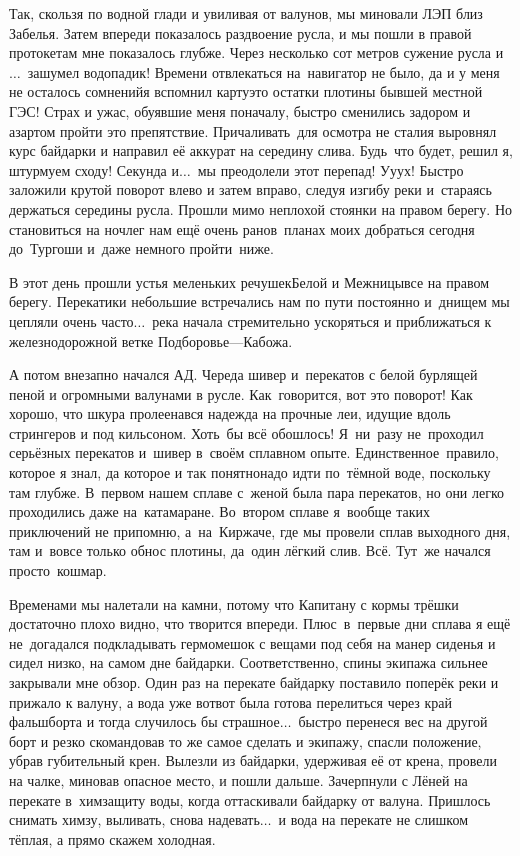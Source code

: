 Так, скользя по водной глади и увиливая от валунов, мы миновали ЛЭП близ Забелья. Затем впереди показалось раздвоение русла, и мы пошли в правой протоке\mdash там мне показалось глубже. Через несколько сот метров сужение русла и$\ldots$~зашумел водопадик! Времени отвлекаться на~навигатор не было, да и у меня не осталось сомнений\mdash я вспомнил карту\mdash это остатки плотины бывшей местной ГЭС! Страх и ужас, обуявшие меня поначалу, быстро сменились задором и азартом пройти это препятствие. Причаливать~для осмотра не стали\mdash я выровнял курс байдарки и направил её аккурат на середину слива. Будь~что будет, решил я, штурмуем сходу! Секунда и$\ldots$~мы преодолели этот перепад! У\sdash у\sdash ух! Быстро заложили крутой поворот влево и затем вправо, следуя изгибу реки и~стараясь держаться середины русла. Прошли мимо неплохой стоянки на правом берегу. Но становиться на ночлег нам ещё очень рано\mdash в~планах моих добраться сегодня до~Тургоши и~даже немного пройти~ниже. 

В этот день прошли устья меленьких речушек\mdash Белой и Межницы\mdash все на правом берегу. Перекатики небольшие встречались нам по пути постоянно и~днищем мы цепляли очень часто$\ldots$~река начала стремительно ускоряться и приближаться к железнодорожной ветке Подборовье\thinspace\nobreakdash---\thinspace Кабожа.

А потом внезапно начался АД. Череда шивер и~перекатов с белой бурлящей пеной и огромными валунами в русле. Как~говорится, вот это поворот! Как хорошо, что шкура пролеена\mdash вся надежда на прочные леи, идущие вдоль стрингеров и под кильсоном. Хоть~бы всё обошлось! Я~ни~разу не~проходил серьёзных перекатов и~шивер в~своём сплавном опыте. Единственное~правило, которое я знал, да которое и так понятно\mdash надо идти по~тёмной воде, поскольку там глубже. В~первом нашем сплаве с~женой была пара перекатов, но они легко проходились даже на~катамаране. Во~втором сплаве я~вообще таких приключений не припомню, а~на~Киржаче, где мы провели сплав выходного дня, там и~вовсе только обнос плотины, да~один лёгкий слив. Всё. Тут~же начался просто~кошмар. 

Временами мы налетали на камни, потому что Капитану с кормы трёшки достаточно плохо видно, что творится впереди. Плюс~в~первые дни сплава я ещё не~догадался подкладывать гермомешок с вещами под себя на манер сиденья и сидел низко, на самом дне байдарки. Соответственно, спины экипажа сильнее закрывали мне обзор. Один раз на перекате байдарку поставило поперёк реки и прижало к валуну, а вода уже вот\sdash вот была готова перелиться через край фальшборта и тогда случилось бы страшное$\ldots$~быстро перенеся вес на другой борт и резко скомандовав то же самое сделать и экипажу, спасли положение, убрав губительный крен. Вылезли из байдарки, удерживая её от крена, провели на чалке, миновав опасное место, и пошли дальше. Зачерпнули с Лёней на перекате в~химзащиту воды, когда оттаскивали байдарку от валуна. Пришлось снимать химзу, выливать, снова надевать$\ldots$~и вода на перекате не слишком тёплая, а прямо скажем холодная. 


